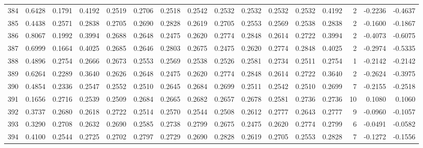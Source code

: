 \begin{tabular}{lrrrrrrrrrrrrrrr}
384 &      0.6428 &  0.1791 &  0.4192 &  0.2519 &  0.2706 &  0.2518 &  0.2542 &  0.2532 &  0.2532 &  0.2532 &   0.2532 &     0.4192 &      2 &                   -0.2236 &                    -0.4637 \\
385 &      0.4438 &  0.2571 &  0.2838 &  0.2705 &  0.2690 &  0.2828 &  0.2619 &  0.2705 &  0.2553 &  0.2569 &   0.2538 &     0.2838 &      2 &                   -0.1600 &                    -0.1867 \\
386 &      0.8067 &  0.1992 &  0.3994 &  0.2688 &  0.2648 &  0.2475 &  0.2620 &  0.2774 &  0.2848 &  0.2614 &   0.2722 &     0.3994 &      2 &                   -0.4073 &                    -0.6075 \\
387 &      0.6999 &  0.1664 &  0.4025 &  0.2685 &  0.2646 &  0.2803 &  0.2675 &  0.2475 &  0.2620 &  0.2774 &   0.2848 &     0.4025 &      2 &                   -0.2974 &                    -0.5335 \\
388 &      0.4896 &  0.2754 &  0.2666 &  0.2673 &  0.2553 &  0.2569 &  0.2538 &  0.2526 &  0.2581 &  0.2734 &   0.2511 &     0.2754 &      1 &                   -0.2142 &                    -0.2142 \\
389 &      0.6264 &  0.2289 &  0.3640 &  0.2626 &  0.2648 &  0.2475 &  0.2620 &  0.2774 &  0.2848 &  0.2614 &   0.2722 &     0.3640 &      2 &                   -0.2624 &                    -0.3975 \\
390 &      0.4854 &  0.2336 &  0.2547 &  0.2552 &  0.2510 &  0.2645 &  0.2684 &  0.2699 &  0.2511 &  0.2542 &   0.2510 &     0.2699 &      7 &                   -0.2155 &                    -0.2518 \\
391 &      0.1656 &  0.2716 &  0.2539 &  0.2509 &  0.2684 &  0.2665 &  0.2682 &  0.2657 &  0.2678 &  0.2581 &   0.2736 &     0.2736 &     10 &                    0.1080 &                     0.1060 \\
392 &      0.3737 &  0.2680 &  0.2618 &  0.2722 &  0.2514 &  0.2570 &  0.2544 &  0.2508 &  0.2612 &  0.2777 &   0.2643 &     0.2777 &      9 &                   -0.0960 &                    -0.1057 \\
393 &      0.3290 &  0.2708 &  0.2632 &  0.2690 &  0.2585 &  0.2738 &  0.2799 &  0.2675 &  0.2475 &  0.2620 &   0.2774 &     0.2799 &      6 &                   -0.0491 &                    -0.0582 \\
394 &      0.4100 &  0.2544 &  0.2725 &  0.2702 &  0.2797 &  0.2729 &  0.2690 &  0.2828 &  0.2619 &  0.2705 &   0.2553 &     0.2828 &      7 &                   -0.1272 &                    -0.1556 \\

\end{tabular}
